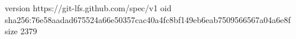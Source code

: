 version https://git-lfs.github.com/spec/v1
oid sha256:76e58aadad675524a66e50357cac40a4fc8bf149eb6eab7509566567a04a6e8f
size 2379
